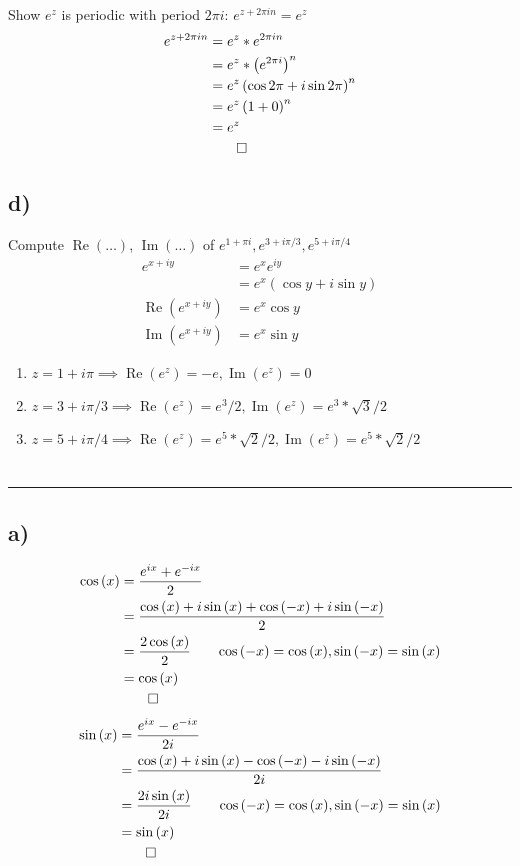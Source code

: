 \documentclass[12pt]{article}
\begin{document}
Show $e^z$ is periodic with period $2\pi i$: $e^{z+2\pi i n} = e^z$
\begin{align*}
	e^{z + 2\pi i n} &= e^z * e^{2\pi i n}\\
	&= e^z * \left(e^{2\pi i}\right)^n\\
	&= e^z \left(\cos{2\pi} + i\sin{2\pi}\right)^n\\
	&= e^z \left(1 + 0\right)^n\\
	&= e^z\\
	&\qed
\end{align*}

\subsection{d)}
Compute $\operatorname{Re}{(\ldots)}$, $\operatorname*{Im}{(\ldots)}$ of $e^{1+\pi i}, e^{3+i\pi/3}, e^{5+i\pi/4}$
\begin{align*}
	e^{x+iy} &= e^x e^{iy}\\
	&= e^x \left( \cos{y} + i\sin{y}\right)\\
	\operatorname{Re}{(e^{x+iy})} &= e^x \cos{y}\\
	\operatorname{Im}{(e^{x+iy})} &= e^x \sin{y}
\end{align*}
\begin{enumerate}
	\item $z = 1+i\pi \implies \operatorname{Re}{(e^z)} = -e, \operatorname{Im}{(e^z)} = 0$
	\item $z = 3+i\pi/3 \implies \operatorname{Re}{(e^z)} = e^3/2, \operatorname{Im}{(e^z)} = e^3  * \sqrt{3}/2$
	\item $z = 5+i\pi/4 \implies \operatorname{Re}{(e^z)} = e^5 * \sqrt{2}/2, \operatorname{Im}{(e^z)} = e^5 * \sqrt{2}/2$
\end{enumerate}
\newpage
\section{}\hrule
\subsection{a)}
\begin{align*}
	\cos{(x)} &= \frac{e^{ix}+e^{-ix}}{2}\\
	&= \frac{\cos{(x)} + i\sin{(x)} + \cos{(-x)} + i\sin{(-x)} }{2}\\
	&= \frac{2\cos{(x)}}{2} \tag*{$\cos{(-x)} = \cos{(x)}, \sin{(-x)} = \sin{(x)}$}\\
	&= \cos{(x)}\\
	&\qed
\end{align*}
\begin{align*}
	\sin{(x)} &= \frac{e^{ix}-e^{-ix}}{2i}\\
	&= \frac{\cos{(x)} + i\sin{(x)} - \cos{(-x)} - i\sin{(-x)} }{2i}\\
	&= \frac{2i\sin{(x)}}{2i} \tag*{$\cos{(-x)} = \cos{(x)}, \sin{(-x)} = \sin{(x)}$}\\
	&= \sin{(x)}\\
	&\qed
\end{align*}
\end{document}
